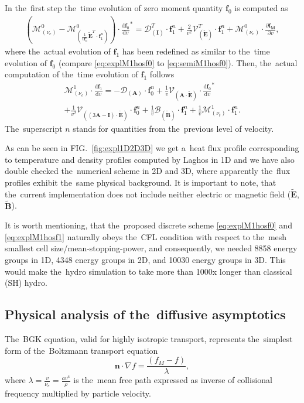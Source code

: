 \documentclass[review]{elsarticle}
\newcommand{\pdv}[2]{\frac{\partial{#1}}{\partial{#2}}}
\newcommand{\vect}[1]{\boldsymbol{#1}}
\newcommand{\matr}[1]{\mathbf{#1}}
\newcommand{\dI}{\text{d}}
\newcommand{\odv}[2]{\frac{\dI #1}{\dI #2}}
\newcommand{\ddv}[2]{\odv{#1}{#2}}
\newcommand{\mfp}{\lambda}
\newcommand{\nue}{\nu_{e}}
\newcommand{\nutot}{\nu_{t}}
\newcommand{\vmag}{v}
\newcommand{\vn}{\vect{n}}
\newcommand{\tE}{\vect{\tilde{E}}}
\newcommand{\tB}{\vect{\tilde{B}}}
\newcommand{\fM}{f_M}
\newcommand{\vfzero}{\vect{f}_0}
\newcommand{\fone}{\vect{f}_1}
\newcommand{\MI}{\matr{I}}
\newcommand{\MA}{\matr{A}}
\newcommand{\IM}{\boldsymbol{\mathcal{M}}}
\newcommand{\ID}{\boldsymbol{\mathcal{D}}}
\newcommand{\IV}{\boldsymbol{\mathcal{V}}}
\newcommand{\IB}{\boldsymbol{\mathcal{B}}}
\newcommand{\figref}[1]{FIG.~\ref{#1}}
\begin{document}
In the~first step the~time evolution of zero moment quantity $\vfzero$ is 
computed as
\begin{multline}
  \left( \IM^0_{\left( \nue \right)} 
  - \IM^0_{\left(\frac{1}{\vmag \vfzero^n}\tE^T\cdot\fone^n\right)}
  \right) \cdot {\ddv{\vfzero}{\vmag}}^* 
  = 
  \ID^T_{\left(\MI\right)} \cdot \fone^n 
  + \frac{2}{\vmag^2}\IV^T_{\left(\tE\right)} \cdot \fone^n
  + \IM^0_{\left( \nue \right)} \cdot \pdv{\vect{\fM}}{\vmag} ,  
  \label{eq:explM1hosf0}
\end{multline}
where the~actual evolution of $\fone$ has been redefined as similar to 
the~time evolution of $\vfzero$ (compare \eqref{eq:explM1hosf0} to 
\eqref{eq:semiM1hosf0}). Then, the~actual computation of the~time evolution 
of $\fone$ follows
\begin{multline}
  \IM^1_{\left( \nue \right)} \cdot \ddv{\fone}{\vmag} 
  = 
  - \ID_{\left(\MA\right)}\cdot \vfzero^n  
  + \frac{1}{\vmag}\IV_{\left(\MA \cdot \tE\right)} \cdot
  {\ddv{\vfzero}{\vmag}}^* \\
  + \frac{1}{\vmag^2}\IV_{\left( 
  \left( 3\MA - \MI \right) \cdot \tE \right)} \cdot \vfzero^n
  + \frac{1}{\vmag}\IB_{\left( \tB \right)} \cdot \fone^n
  + \frac{1}{\vmag}\IM^1_{\left( \nutot \right)} 
  \cdot \fone^n .
  \label{eq:explM1hosf1}
\end{multline}
The~superscript $n$ stands for quantities from the~previous level of velocity.

As can be seen in \figref{fig:expl1D2D3D} we get a~heat flux profile 
corresponding to temperature and density profiles computed by Laghos 
\cite{Dobrev_Kolev_Rieben-High-order_curvilinear_finite_element_methods_for_Lagrangian_hydrodynamics}
in 1D and we have also double checked the~numerical scheme in 2D and 3D, where
apparently the~flux profiles exhibit the~same physical background.
It is important to note, that the~current implementation does not include
neither electric or magnetic field ($\tE$, $\tB$).

It is worth mentioning, that the~proposed discrete scheme 
\eqref{eq:explM1hosf0} and \eqref{eq:explM1hosf1} naturally obeys the~CFL
condition with respect to the~mesh smallest cell size/mean-stopping-power, and
consequently, we needed 8858 energy groups in 1D, 4348 energy groups in 2D, and
10030 energy groups in 3D. This would make the~hydro simulation to take 
more than 1000x longer than classical (SH) hydro.

\subsection{Physical analysis of the~diffusive asymptotics}\label{sec:diffusive_asymptotics}
The~BGK equation, valid for highly isotropic transport, represents 
the~simplest form of the~Boltzmann transport equation
\begin{equation}
  \vn\cdot\nabla f = \frac{\left(\fM - f\right)}{\mfp} ,
  \label{eq:BGK}
\end{equation}
where $\mfp = \frac{\vmag}{\nue} = \frac{a \vmag^4}{\rho}$ is the~mean 
free path expressed as inverse of collisional frequency multiplied by 
particle velocity.
\end{document}
